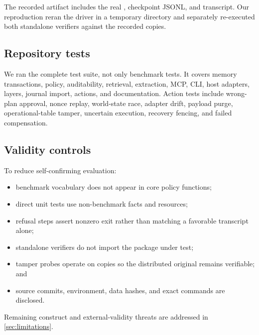 The recorded artifact includes the real , checkpoint JSONL, and transcript. Our reproduction reran the driver in a temporary directory and separately re-executed both standalone verifiers against the recorded copies.

\subsection{Repository tests}

We ran the complete test suite, not only benchmark tests. It covers memory transactions, policy, auditability, retrieval, extraction, MCP, CLI, host adapters, layers, journal import, actions, and documentation. Action tests include wrong-plan approval, nonce replay, world-state race, adapter drift, payload purge, operational-table tamper, uncertain execution, recovery fencing, and failed compensation.

\subsection{Validity controls}

To reduce self-confirming evaluation:

\begin{itemize}
  \item benchmark vocabulary does not appear in core policy functions;
  \item direct unit tests use non-benchmark facts and resources;
  \item refusal steps assert nonzero exit rather than matching a favorable transcript alone;
  \item standalone verifiers do not import the package under test;
  \item tamper probes operate on copies so the distributed original remains verifiable; and
  \item source commits, environment, data hashes, and exact commands are disclosed.
\end{itemize}

Remaining construct and external-validity threats are addressed in \cref{sec:limitations}.
